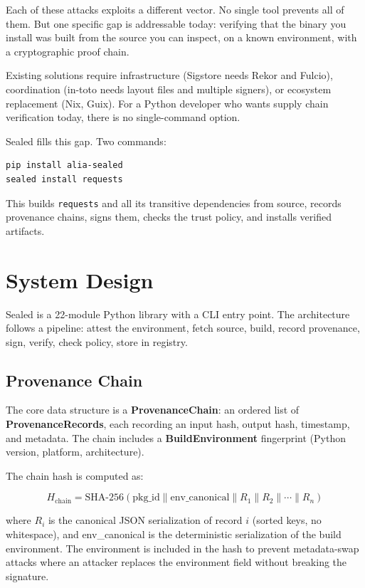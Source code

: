 \documentclass[11pt,a4paper]{article}
\begin{document}
Each of these attacks exploits a different vector. No single tool prevents all of them. But one specific gap is addressable today: verifying that the binary you install was built from the source you can inspect, on a known environment, with a cryptographic proof chain.

Existing solutions require infrastructure (Sigstore needs Rekor and Fulcio), coordination (in-toto needs layout files and multiple signers), or ecosystem replacement (Nix, Guix). For a Python developer who wants supply chain verification today, there is no single-command option.

Sealed fills this gap. Two commands:

\begin{lstlisting}
pip install alia-sealed
sealed install requests
\end{lstlisting}

This builds \texttt{requests} and all its transitive dependencies from source, records provenance chains, signs them, checks the trust policy, and installs verified artifacts.

\section{System Design}

Sealed is a 22-module Python library with a CLI entry point. The architecture follows a pipeline: attest the environment, fetch source, build, record provenance, sign, verify, check policy, store in registry.

\subsection{Provenance Chain}

The core data structure is a \textbf{ProvenanceChain}: an ordered list of \textbf{ProvenanceRecords}, each recording an input hash, output hash, timestamp, and metadata. The chain includes a \textbf{BuildEnvironment} fingerprint (Python version, platform, architecture).

The chain hash is computed as:

\begin{equation}
  H_{\text{chain}} = \text{SHA-256}(\text{pkg\_id} \| \text{env\_canonical} \| R_1 \| R_2 \| \cdots \| R_n)
\end{equation}

where $R_i$ is the canonical JSON serialization of record $i$ (sorted keys, no whitespace), and env\_canonical is the deterministic serialization of the build environment. The environment is included in the hash to prevent metadata-swap attacks where an attacker replaces the environment field without breaking the signature.
\end{document}
